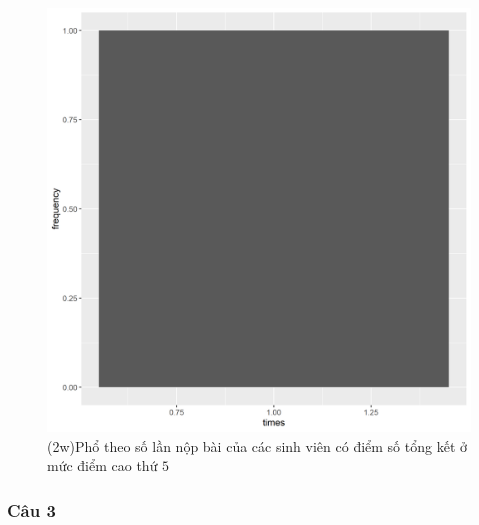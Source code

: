 \documentclass[a4paper]{article}
\theoremstyle{definition}
\begin{document}
\begin{figure}[!ht]
    \centering
    \includegraphics[scale=0.4]{Pics/q2w-5-file1.png}
    \caption{(2w)Phổ theo số lần nộp bài của các sinh viên có điểm số tổng kết ở mức điểm cao thứ $5$}
    \label{fig:my_label}
\end{figure}
\newpage



\subsubsection{Câu 3}
\newpage
\end{document}
